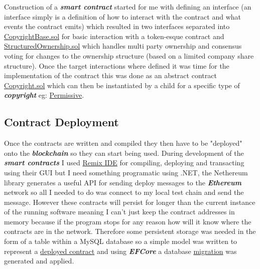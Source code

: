 \documentclass[12pt]{article}
\newcommand{\keyword}[1]{\textbf{\textit{#1}}}
\begin{document}
Construction of a \keyword{smart contract} started for me with defining an interface (an interface simply is a definition of how to interact with the contract and what events the contract emits) which resulted in two interfaces separated into \href{https://github.com/MrHarrisonBarker/CRPL/blob/main/CRPL.Contracts/contracts/CopyrightBase.sol}{CopyrightBase.sol} for basic interaction with a token-esque contract and \href{https://github.com/MrHarrisonBarker/CRPL/blob/main/CRPL.Contracts/contracts/StructuredOwnership.sol}{StructuredOwnership.sol} which handles multi party ownership and consensus voting for changes to the ownership structure (based on a limited company share structure). Once the target interactions where defined it was time for the implementation of the contract this was done as an abstract contract \href{https://github.com/MrHarrisonBarker/CRPL/blob/main/CRPL.Contracts/contracts/Copyrights/Copyright.sol}{Copyright.sol} which can then be instantiated by a child for a specific type of \keyword{copyright} eg: \href{https://github.com/MrHarrisonBarker/CRPL/blob/main/CRPL.Contracts/contracts/Copyrights/Permissive.sol}{Permissive}.


\subsection{Contract Deployment}

Once the contracts are written and compiled they then have to be "deployed" onto the \keyword{blockchain} so they can start being used. During development of the \keyword{smart contracts} I used \href{https://remix.ethereum.org}{Remix IDE} for compiling, deploying and transacting using their GUI but I need something programatic using .NET, the Nethereum library generates a useful API for sending deploy messages to the \keyword{Ethereum} network so all I needed to do was connect to my local test chain and send the message. However these contracts will persist for longer than the current instance of the running software meaning I can't just keep the contract addresses in memory because if the program stops for any reason how will it know where the contracts are in the network. Therefore some persistent storage was needed in the form of a table within a MySQL database so a simple model was written to represent a \href{https://github.com/MrHarrisonBarker/CRPL/blob/main/CRPL.Data/ContractDeployment/DeployedContract.cs}{deployed contract} and using \keyword{EFCore} a database \href{https://github.com/MrHarrisonBarker/CRPL/blob/main/CRPL.Web/Migrations/20220123013118_DeployedContracts.cs}{migration} was generated and applied.
\end{document}
